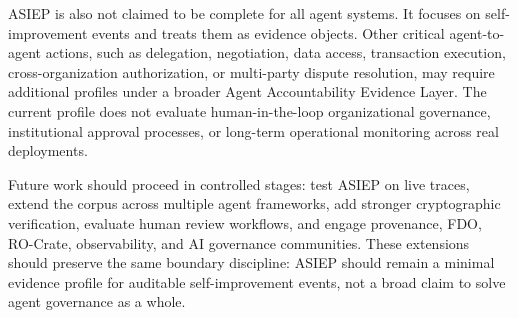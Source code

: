 ASIEP is also not claimed to be complete for all agent systems. It focuses on self-improvement events and treats them as evidence objects. Other critical agent-to-agent actions, such as delegation, negotiation, data access, transaction execution, cross-organization authorization, or multi-party dispute resolution, may require additional profiles under a broader Agent Accountability Evidence Layer. The current profile does not evaluate human-in-the-loop organizational governance, institutional approval processes, or long-term operational monitoring across real deployments.

Future work should proceed in controlled stages: test ASIEP on live traces, extend the corpus across multiple agent frameworks, add stronger cryptographic verification, evaluate human review workflows, and engage provenance, FDO, RO-Crate, observability, and AI governance communities. These extensions should preserve the same boundary discipline: ASIEP should remain a minimal evidence profile for auditable self-improvement events, not a broad claim to solve agent governance as a whole.
